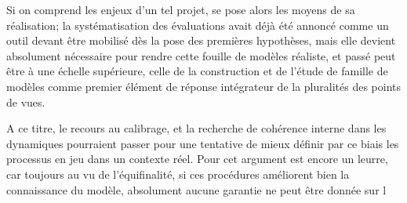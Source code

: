 Si on comprend les enjeux d'un tel projet, se pose alors les moyens de sa réalisation; la systématisation des évaluations avait déjà été annoncé comme un outil devant être mobilisé dès la pose des premières hypothèses, mais elle devient absolument nécessaire pour rendre cette fouille de modèles réaliste, et passé peut être à une échelle supérieure, celle de la construction et de l'étude de famille de modèles comme premier élément de réponse intégrateur de la pluralités des points de vues.

A ce titre, le recours au calibrage, et la recherche de cohérence interne dans les dynamiques pourraient passer pour une tentative de mieux définir par ce biais les processus en jeu dans un contexte réel. Pour \autocite{OSullivan2004} cet argument est encore un leurre, car toujours au vu de l'équifinalité, si ces procédures améliorent bien la connaissance du modèle, absolument aucune garantie ne peut être donnée sur l